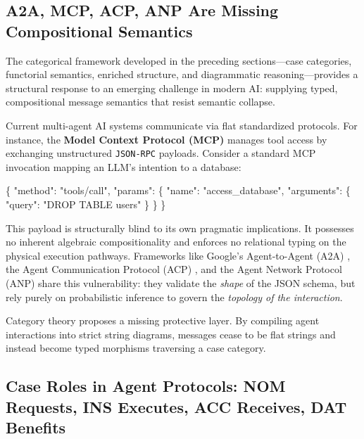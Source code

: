 \documentclass[
]{article}
\newenvironment{Shaded}{}{}
\newcommand{\DataTypeTok}[1]{\textcolor[rgb]{0.56,0.13,0.00}{#1}}
\newcommand{\FunctionTok}[1]{\textcolor[rgb]{0.02,0.16,0.49}{#1}}
\newcommand{\StringTok}[1]{\textcolor[rgb]{0.25,0.44,0.63}{#1}}
\begin{document}
\subsection{A2A, MCP, ACP, ANP Are Missing Compositional
Semantics}\label{a2a-mcp-acp-anp-are-missing-compositional-semantics}

The categorical framework developed in the preceding sections---case
categories, functorial semantics, enriched structure, and diagrammatic
reasoning---provides a structural response to an emerging challenge in
modern AI: supplying typed, compositional message semantics that resist
semantic collapse.

Current multi-agent AI systems communicate via flat standardized
protocols. For instance, the \textbf{Model Context Protocol (MCP)}
\citep{anthropic2024mcp} manages tool access by exchanging unstructured
\texttt{JSON-RPC} payloads. Consider a standard MCP invocation mapping
an LLM's intention to a database:

\begin{Shaded}
\begin{Highlighting}[]
\FunctionTok{\{}
  \DataTypeTok{"method"}\FunctionTok{:} \StringTok{"tools/call"}\FunctionTok{,}
  \DataTypeTok{"params"}\FunctionTok{:} \FunctionTok{\{}
    \DataTypeTok{"name"}\FunctionTok{:} \StringTok{"access\_database"}\FunctionTok{,}
    \DataTypeTok{"arguments"}\FunctionTok{:} \FunctionTok{\{} \DataTypeTok{"query"}\FunctionTok{:} \StringTok{"DROP TABLE users"} \FunctionTok{\}}
  \FunctionTok{\}}
\FunctionTok{\}}
\end{Highlighting}
\end{Shaded}

This payload is structurally blind to its own pragmatic implications. It
possesses no inherent algebraic compositionality and enforces no
relational typing on the physical execution pathways. Frameworks like
Google's Agent-to-Agent (A2A) \citep{google2025a2a}, the Agent
Communication Protocol (ACP) \citep{acp2025protocol}, and the Agent
Network Protocol (ANP) \citep{anp2025protocol} share this vulnerability:
they validate the \emph{shape} of the JSON schema, but rely purely on
probabilistic inference to govern the \emph{topology of the
interaction}.

Category theory proposes a missing protective layer. By compiling agent
interactions into strict string diagrams, messages cease to be flat
strings and instead become typed morphisms traversing a case category.

\subsection{Case Roles in Agent Protocols: NOM Requests, INS Executes,
ACC Receives, DAT
Benefits}\label{case-roles-in-agent-protocols-nom-requests-ins-executes-acc-receives-dat-benefits}
\end{document}
